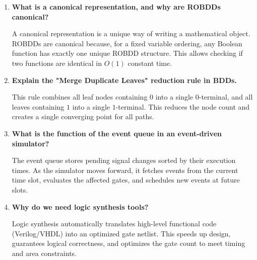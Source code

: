 \documentclass[12pt,a4paper]{article}
\newcommand{\Q}[1]{\textbf{#1}\par\noindent\ignorespaces}
\begin{document}
\begin{tcolorbox}[exambox, title={\textbf{Frequently Asked / Viva Questions}}]
\begin{enumerate}[leftmargin=*, topsep=0pt, label=\textbf{Q\arabic*.}, itemsep=6pt]
  \item \Q{What is a canonical representation, and why are ROBDDs canonical?}
        A canonical representation is a unique way of writing a mathematical object. ROBDDs are canonical because, for a fixed variable ordering, any Boolean function has exactly one unique ROBDD structure. This allows checking if two functions are identical in $O(1)$ constant time.
        
  \item \Q{Explain the "Merge Duplicate Leaves" reduction rule in BDDs.}
        This rule combines all leaf nodes containing $0$ into a single $0$-terminal, and all leaves containing $1$ into a single $1$-terminal. This reduces the node count and creates a single converging point for all paths.
        
  \item \Q{What is the function of the event queue in an event-driven simulator?}
        The event queue stores pending signal changes sorted by their execution times. As the simulator moves forward, it fetches events from the current time slot, evaluates the affected gates, and schedules new events at future slots.
        
  \item \Q{Why do we need logic synthesis tools?}
        Logic synthesis automatically translates high-level functional code (Verilog/VHDL) into an optimized gate netlist. This speeds up design, guarantees logical correctness, and optimizes the gate count to meet timing and area constraints.
\end{enumerate}
\end{tcolorbox}

\vspace{6pt}
\end{document}
